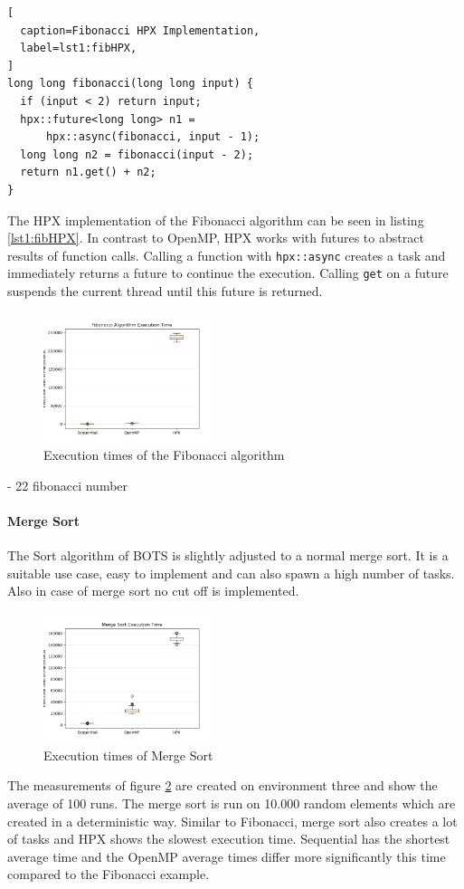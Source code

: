 \begin{lstlisting}[
  caption=Fibonacci HPX Implementation,
  label=lst1:fibHPX,
]
long long fibonacci(long long input) {
  if (input < 2) return input;
  hpx::future<long long> n1 =
      hpx::async(fibonacci, input - 1);
  long long n2 = fibonacci(input - 2);
  return n1.get() + n2;
}
\end{lstlisting}
  The HPX implementation of the Fibonacci algorithm can be seen in listing \ref{lst1:fibHPX}.
  In contrast to OpenMP, HPX works with futures to abstract results of function calls.
  Calling a function with \texttt{hpx::async} creates a task and immediately returns a future to continue the execution.
  Calling \texttt{get} on a future suspends the current thread until this future is returned.
\begin{figure}[htbp]
	\centering
	\includegraphics[width=0.45\textwidth]{figures/fib_NoOp.png}
	\caption{Execution times of the Fibonacci algorithm}
	\label{fig:fib_NoOp}
\end{figure}

- 22 fibonacci number
  \\
 
  \paragraph{Merge Sort}
  The Sort algorithm of BOTS is slightly adjusted to a normal merge sort.
  It is a suitable use case, easy to implement and can also spawn a high number of tasks.
  Also in case of merge sort no cut off is implemented.
  \begin{figure}[htbp]
	\centering
	\includegraphics[width=0.45\textwidth]{figures/sort_NoOp.png}
	\caption{Execution times of Merge Sort}
	\label{fig:sort_NoOp}
  \end{figure}
  The measurements of figure \ref{fig:sort_NoOp} are created on environment three and show the average of 100 runs.
  The merge sort is run on 10.000 random elements which are created in a deterministic way.
  Similar to Fibonacci, merge sort also creates a lot of tasks and HPX shows the slowest execution time.
  Sequential has the shortest average time and the OpenMP average times differ more significantly this time compared to the Fibonacci example. 
  \\
  
